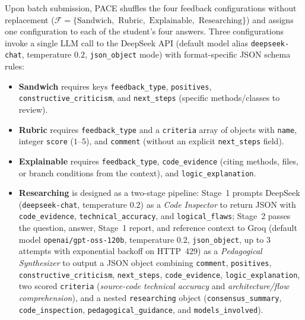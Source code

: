 \documentclass{llncs}
\begin{document}
Upon batch submission, PACE shuffles the four feedback configurations without replacement ($\mathcal{F} = \{\text{Sandwich},$ $\text{Rubric},$ $\text{Explainable},$ $\text{Researching}\}$) and assigns one configuration to each of the student's four answers. Three configurations invoke a single LLM call to the DeepSeek API (default model alias \texttt{deepseek-chat}, temperature $0.2$, \texttt{json\_object} mode) with format-specific JSON schema rules:
\begin{itemize}
    \item \textbf{Sandwich} requires keys \texttt{feedback\_type}, \texttt{positives}, \texttt{constructive\_\allowbreak criticism}, and \texttt{next\_steps} (specific methods/classes to review).
    \item \textbf{Rubric} requires \texttt{feedback\_type} and a \texttt{criteria} array of objects with \texttt{name}, integer \texttt{score} ($1\text{--}5$), and \texttt{comment} (without an explicit \texttt{next\_steps} field).
    \item \textbf{Explainable} requires \texttt{feedback\_type}, \texttt{code\_evidence} (citing methods, files, or branch conditions from the context), and \texttt{logic\_explanation}.
    \item \textbf{Researching} is designed as a two-stage pipeline: Stage~1 prompts DeepSeek (\texttt{deepseek-chat}, temperature $0.2$) as a \textit{Code Inspector} to return JSON with \texttt{code\_evidence}, \texttt{technical\_accuracy}, and \texttt{logical\_flaws}; Stage~2 passes the question, answer, Stage~1 report, and reference context to Groq (default model \texttt{openai/gpt-oss-120b}, temperature $0.2$, \texttt{json\_object}, up to 3 attempts with exponential backoff on HTTP~429) as a \textit{Pedagogical Synthesizer} to output a JSON object combining \texttt{comment}, \texttt{positives}, \texttt{constructive\_criticism}, \texttt{next\_steps}, \texttt{code\_evidence}, \texttt{logic\_explanation}, two scored \texttt{criteria} (\emph{source-code technical accuracy} and \emph{architecture/flow comprehension}), and a nested \texttt{researching} object (\texttt{consensus\_summary}, \texttt{code\_inspection}, \texttt{pedagogical\_guidance}, and \texttt{models\_involved}).
\end{itemize}
\end{document}
